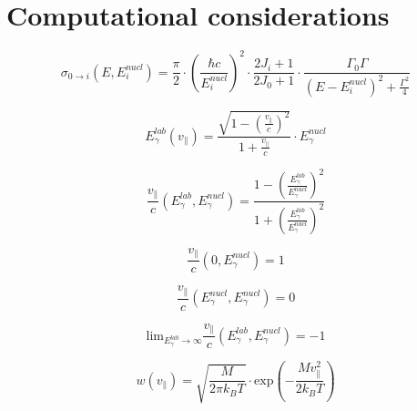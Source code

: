 \documentclass{article}
\begin{document}


\section{Computational considerations}

\begin{equation}
\label{breit_wigner}
\sigma_{0 \to i} (E, E_i^{nucl}) = \frac{\pi}{2} \cdot \left( \frac{\hbar c}{E_i^{nucl}} \right)^2 \cdot \frac{2 J_i + 1}{2 J_0 + 1} \cdot \frac{\Gamma_0 \Gamma}{\left( E - E_i^{nucl} \right)^2 + \frac{\Gamma^2}{4}}
\end{equation}

\begin{equation}
\label{doppler_shift}
E_\gamma^{lab}(v_\parallel) = \frac{\sqrt{1 - \left( \frac{v_\parallel}{c} \right)^2}}{1 + \frac{v_\parallel}{c}} \cdot E_\gamma^{nucl}
\end{equation}

\begin{equation}
\label{doppler_shift_inverse}
\frac{v_\parallel}{c} \left( E_\gamma^{lab}, E_\gamma^{nucl} \right) = \frac{1 - \left( \frac{E_\gamma^{lab}}{E_\gamma^{nucl}} \right)^2}{1 + \left( \frac{E_\gamma^{lab}}{E_\gamma^{nucl}} \right)^2}
\end{equation}

\begin{equation}
\frac{v_\parallel}{c} \left( 0, E_\gamma^{nucl} \right) = 1
\end{equation}

\begin{equation}
	\frac{v_\parallel}{c} \left( E_\gamma^{nucl}, E_\gamma^{nucl} \right) = 0
\end{equation}

\begin{equation}
\mathrm{lim}_{E_\gamma^{lab} \to \infty} \frac{v_\parallel}{c} \left( E_\gamma^{lab}, E_\gamma^{nucl} \right) = -1
\end{equation}

\begin{equation}
\label{maxwell_boltzmann_distribution_2}
w\left(v_\parallel \right) = \sqrt{\frac{M}{2 \pi k_B T}} \cdot \mathrm{exp} \left( -\frac{M v_\parallel^2}{2 k_B T} \right) 
\end{equation}
\end{document}
